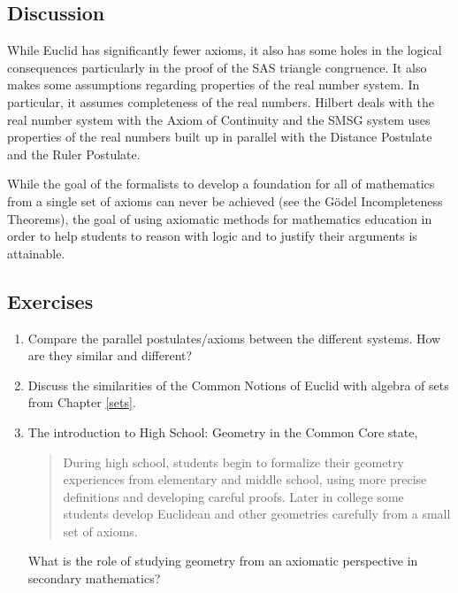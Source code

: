 \documentclass[
]{book}
\theoremstyle{definition}
\theoremstyle{definition}
\theoremstyle{definition}
\theoremstyle{definition}
\theoremstyle{remark}
\begin{document}
\hypertarget{discussion}{%
\subsection{Discussion}\label{discussion}}

While Euclid has significantly fewer axioms, it also has some holes in the logical consequences particularly in the proof of the SAS triangle congruence. It also makes some assumptions regarding properties of the real number system. In particular, it assumes completeness of the real numbers. Hilbert deals with the real number system with the Axiom of Continuity and the SMSG system uses properties of the real numbers built up in parallel with the Distance Postulate and the Ruler Postulate.

While the goal of the formalists to develop a foundation for all of mathematics from a single set of axioms can never be achieved (see the Gödel Incompleteness Theorems), the goal of using axiomatic methods for mathematics education in order to help students to reason with logic and to justify their arguments is attainable.

\hypertarget{exercises-37}{%
\subsection{Exercises}\label{exercises-37}}

\begin{enumerate}
\def\labelenumi{\arabic{enumi}.}
\item
  Compare the parallel postulates/axioms between the different systems. How are they similar and different?
\item
  Discuss the similarities of the Common Notions of Euclid with algebra of sets from Chapter \ref{sets}.
\item
  The introduction to High School: Geometry in the Common Core state,

  \begin{quote}
  During high school, students begin to formalize their geometry experiences from elementary and middle school, using more precise definitions and developing careful proofs. Later in college some students develop Euclidean and other geometries carefully from a small set of axioms.
  \end{quote}

  What is the role of studying geometry from an axiomatic perspective in secondary mathematics?
\end{enumerate}
\end{document}
